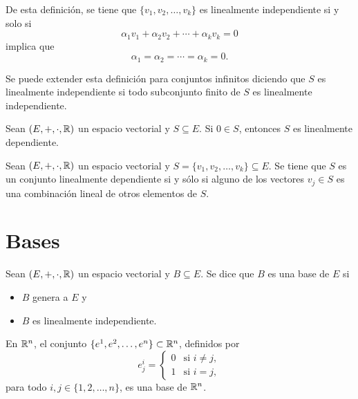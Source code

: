 \documentclass[a4,11pt]{aleph-notas}
\begin{document}
\begin{advertencia}
    De esta definición, se tiene que $\{v_1,v_2,\ldots,v_k\}$ es linealmente independiente si y solo si
    \[
        \alpha_1 v_1 + \alpha_2 v_2 + \cdots + \alpha_k v_k = 0
    \]
    implica que
    \[
        \alpha_1 = \alpha_2 = \cdots = \alpha_k = 0.
    \]
\end{advertencia}

\begin{advertencia}
    Se puede extender esta definición para conjuntos infinitos diciendo que $S$ es linealmente independiente si todo subconjunto finito de $S$ es linealmente independiente.
\end{advertencia}

\begin{teo}
    Sean $(E,+,\cdot,\mathbb{R})$ un espacio vectorial y $S\subseteq E$. Si $0\in S$, entonces $S$ es linealmente dependiente.
\end{teo}

\begin{teo}
    Sean $(E,+,\cdot,\mathbb{R})$ un espacio vectorial y $S=\{v_1,v_2,\ldots,v_k\}\subseteq E$. Se tiene que $S$ es un conjunto linealmente dependiente si y sólo si alguno de los vectores $v_j\in S$ es una combinación lineal de otros elementos de $S$.
\end{teo}

\section{Bases}

\begin{defi}
    Sean $(E,+,\cdot,\mathbb{R})$ un espacio vectorial y $B\subseteq E$. Se dice que $B$ es una base de $E$ si 
    \begin{itemize}
        \item $B$ genera a $E$ y 
        \item $B$ es linealmente independiente. 
    \end{itemize}
\end{defi}


\begin{teo}
    En $\mathbb{R}^n$, el conjunto $\{e^1,e^2,\ldots,e^n\}\subset\mathbb{R}^n$, definidos por 
    \[
        e^i_j=
        \begin{cases}
            0& \text{si }i\neq j,\\
            1& \text{si }i= j,
        \end{cases}
    \]
    para todo $i,j\in\{1,2,\ldots,n\}$, es una base de $\mathbb{R}^n$.
\end{teo}
\end{document}
